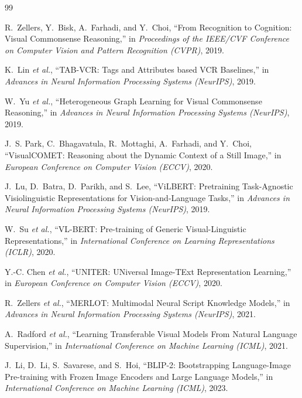 \documentclass[12pt,a4paper,oneside]{report}
\begin{document}
\begin{thebibliography}{99}
\setlength{\itemsep}{2pt}

R.~Zellers, Y.~Bisk, A.~Farhadi, and Y.~Choi, ``From Recognition to Cognition:
Visual Commonsense Reasoning,'' in \emph{Proceedings of the IEEE/CVF Conference
on Computer Vision and Pattern Recognition (CVPR)}, 2019.

K.~Lin \emph{et al.}, ``TAB-VCR: Tags and Attributes based VCR Baselines,'' in
\emph{Advances in Neural Information Processing Systems (NeurIPS)}, 2019.

W.~Yu \emph{et al.}, ``Heterogeneous Graph Learning for Visual Commonsense
Reasoning,'' in \emph{Advances in Neural Information Processing Systems
(NeurIPS)}, 2019.

J.~S. Park, C.~Bhagavatula, R.~Mottaghi, A.~Farhadi, and Y.~Choi,
``VisualCOMET: Reasoning about the Dynamic Context of a Still Image,'' in
\emph{European Conference on Computer Vision (ECCV)}, 2020.

J.~Lu, D.~Batra, D.~Parikh, and S.~Lee, ``ViLBERT: Pretraining Task-Agnostic
Visiolinguistic Representations for Vision-and-Language Tasks,'' in
\emph{Advances in Neural Information Processing Systems (NeurIPS)}, 2019.

W.~Su \emph{et al.}, ``VL-BERT: Pre-training of Generic Visual-Linguistic
Representations,'' in \emph{International Conference on Learning
Representations (ICLR)}, 2020.

Y.-C. Chen \emph{et al.}, ``UNITER: UNiversal Image-TExt Representation
Learning,'' in \emph{European Conference on Computer Vision (ECCV)}, 2020.

R.~Zellers \emph{et al.}, ``MERLOT: Multimodal Neural Script Knowledge
Models,'' in \emph{Advances in Neural Information Processing Systems
(NeurIPS)}, 2021.

A.~Radford \emph{et al.}, ``Learning Transferable Visual Models From Natural
Language Supervision,'' in \emph{International Conference on Machine Learning
(ICML)}, 2021.

J.~Li, D.~Li, S.~Savarese, and S.~Hoi, ``BLIP-2: Bootstrapping Language-Image
Pre-training with Frozen Image Encoders and Large Language Models,'' in
\emph{International Conference on Machine Learning (ICML)}, 2023.


\end{thebibliography}
\end{document}
